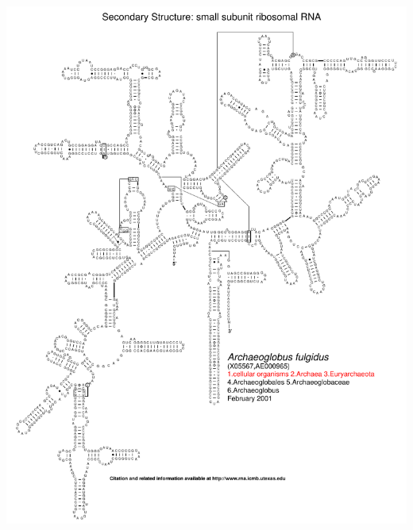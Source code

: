 \documentclass[landscape]{slides}
\begin{document}
\begin{slide}\begin{center}\includegraphics[height=8in]{figs/arc-1}\end{center}\vfill\end{slide}
\end{document}
